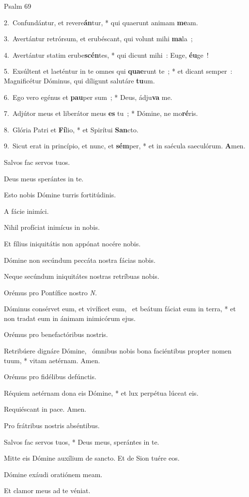 
Psalm 69



\begin{hangparas}{1em}{1}
\parskip0mm
2.~Confundántur, et revere\textbf{án}tur, * qui quaerunt animam \textbf{me}am.

3.~Avertántur retrórsum, et erubéscant, qui volunt mihi \textbf{ma}la~;

4.~Avertántur statim erube\textbf{scén}tes, * qui dicunt mihi~: Euge, \textbf{éu}ge~!

5.~Exsúltent et laeténtur in te omnes qui \textbf{quae}runt te~; * et dicant
semper~: Magnificétur Dóminus, qui díligunt salutáre \textbf{tu}um.

6.~Ego vero egénus et \textbf{pau}per sum~; * Deus, ádju\textbf{va} me.

7.~Adjútor meus et liberátor meus \textbf{es} tu~; * Dómine, ne mo\textbf{ré}ris.

8.~Glória Patri et \textbf{Fí}lio, * et Spirítui \textbf{San}cto.

9.~Sicut erat in princípio, et nunc, et \textbf{sém}per, * et in
saécula saeculórum.  \textbf{A}men.

\Vbar Salvos fac servos tuos.

\Rbar Deus meus sperántes in te.

\Vbar Esto nobis Dómine turris fortitúdinis.

\Rbar A fácie inimíci.

\Vbar Nihil profíciat inimícus in nobis.

\Rbar Et fílius iniquitátis non appónat nocére nobis.

\Vbar Dómine non secúndum peccáta nostra fácias nobis.

\Rbar Neque secúndum iniquitátes nostras retríbuas nobis.

\Vbar Orémus pro Pontífice nostro \emph{N.}

\Rbar Dóminus consérvet eum, et vivíficet eum, \dag\ 
et beátum fáciat eum in terra, * 
et non tradat eum in ánimam inimicórum ejus.

\Vbar Orémus pro benefactóribus nostris.

\Rbar Retribúere dignáre Dómine, \dag\ 
ómnibus nobis bona faciéntibus propter nomen tuum, *
vitam aetérnam.  Amen.

\Vbar Orémus pro fidélibus defúnctis.

\Rbar Réquiem aetérnam dona eis Dómine, *
et lux perpétua lúceat eis.

\Vbar Requiéscant in pace.  \Rbar Amen.

\Vbar Pro frátribus nostris abséntibus.

\Rbar Salvos fac servos tuos, *
Deus meus, sperántes in te.

\Vbar Mitte eis Dómine auxílium de sancto. \Rbar Et de Sion tuére eos.

\Vbar Dómine exáudi oratiónem meam.

\Rbar Et clamor meus ad te véniat.

\end{hangparas}



